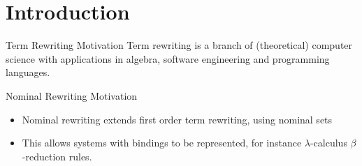 \section{Introduction}

\begin{frame}{Term Rewriting Motivation}
    Term rewriting is a branch of (theoretical) computer science with applications in 
    algebra, software engineering and programming languages. 
\end{frame}

\begin{frame}{Nominal Rewriting Motivation}
\begin{itemize} 
    \item Nominal rewriting extends first order term rewriting, using nominal sets
    \item This allows systems with bindings to be represented, for instance
        $\lambda$-calculus $\beta$-reduction rules. 
\end{itemize}
\end{frame}


